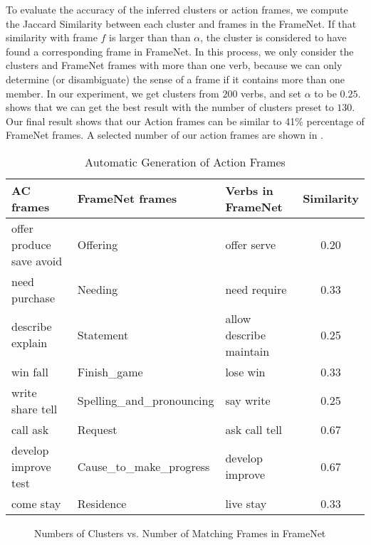 To evaluate the accuracy of the inferred clusters or action frames, 
we compute the Jaccard Similarity between each cluster and frames in 
the FrameNet. If that similarity with frame $f$ is larger than 
than $\alpha$, the cluster is considered to have found a corresponding
frame in FrameNet. 
In this process, we only consider the clusters and FrameNet frames 
with more than one verb, because we can only determine (or
disambiguate) the sense of a frame if it contains more than one member. 
In our experiment, we get clusters from $200$ verbs, 
and set $\alpha$ to be $0.25$.  shows that we 
can get the best result with the number of clusters preset to $130$. 
Our final result shows that our Action frames can be similar 
to 41\% percentage of FrameNet frames. A selected number of
our action frames are shown in .
\begin{table*}[th]
\small
\centering
\caption{Automatic Generation of Action Frames}
\begin{tabular}{|l|l|l|c|}
\hline
AC frames & FrameNet frames & Verbs in FrameNet& Similarity \\
\hline \hline
offer	produce	save	avoid & Offering & offer serve & 0.20 \\
\hline
need	purchase & Needing & need require & 0.33 \\
\hline
describe explain & Statement & allow describe maintain & 0.25 \\
\hline
win	fall& Finish\_game & lose win & 0.33 \\
\hline
write	share	tell & Spelling\_and\_pronouncing & say write &0.25 \\
\hline
call	ask & Request & ask call tell &0.67 \\
\hline
develop	improve	test & Cause\_to\_make\_progress & develop improve & 0.67 \\
\hline
come stay & Residence & live stay & 0.33 \\
\hline
\end{tabular}
\label{cluster}
\end{table*}

\begin{figure}[th]
\centering
{}
\vspace*{-4ex}
\caption{Numbers of Clusters vs. Number of Matching Frames in FrameNet}
\label{fig:cluster}
\end{figure}


